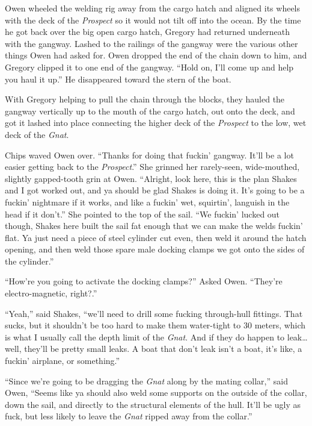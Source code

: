 \documentclass[
]{scrbook}
\begin{document}
Owen wheeled the welding rig away from the cargo hatch and aligned its
wheels with the deck of the \emph{Prospect} so it would not tilt off
into the ocean. By the time he got back over the big open cargo hatch,
Gregory had returned underneath with the gangway. Lashed to the railings
of the gangway were the various other things Owen had asked for. Owen
dropped the end of the chain down to him, and Gregory clipped it to one
end of the gangway. ``Hold on, I'll come up and help you haul it up.''
He disappeared toward the stern of the boat.

With Gregory helping to pull the chain through the blocks, they hauled
the gangway vertically up to the mouth of the cargo hatch, out onto the
deck, and got it lashed into place connecting the higher deck of the
\emph{Prospect} to the low, wet deck of the \emph{Gnat}.

Chips waved Owen over. ``Thanks for doing that fuckin' gangway. It'll be
a lot easier getting back to the \emph{Prospect}.'' She grinned her
rarely-seen, wide-mouthed, slightly gapped-tooth grin at Owen.
``Alright, look here, this is the plan Shakes and I got worked out, and
ya should be glad Shakes is doing it. It's going to be a fuckin'
nightmare if it works, and like a fuckin' wet, squirtin', languish in
the head if it don't.'' She pointed to the top of the sail. ``We fuckin'
lucked out though, Shakes here built the sail fat enough that we can
make the welds fuckin' flat. Ya just need a piece of steel cylinder cut
even, then weld it around the hatch opening, and then weld those spare
male docking clamps we got onto the sides of the cylinder.''

``How're you going to activate the docking clamps?'' Asked Owen.
``They're electro-magnetic, right?.''

``Yeah,'' said Shakes, ``we'll need to drill some fucking through-hull
fittings. That sucks, but it shouldn't be too hard to make them
water-tight to 30 meters, which is what I usually call the depth limit
of the \emph{Gnat}. And if they do happen to leak\ldots{} well, they'll
be pretty small leaks. A boat that don't leak isn't a boat, it's like, a
fuckin' airplane, or something.''

``Since we're going to be dragging the \emph{Gnat} along by the mating
collar,'' said Owen, ``Seems like ya should also weld some supports on
the outside of the collar, down the sail, and directly to the structural
elements of the hull. It'll be ugly as fuck, but less likely to leave
the \emph{Gnat} ripped away from the collar.''
\end{document}
